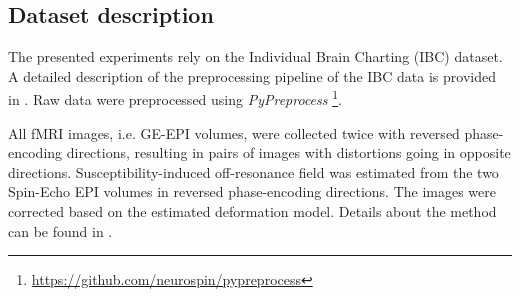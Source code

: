 

\subsection{Dataset description}
%
The presented experiments rely on the Individual Brain Charting (IBC) dataset.
%
A detailed description of the preprocessing pipeline of the IBC data is provided
in \citep{Pinho2021}.
%
Raw data were preprocessed using \emph{PyPreprocess}
\footnote{\url{https://github.com/neurospin/pypreprocess}}.

All fMRI images, i.e. GE-EPI volumes, were collected twice with reversed
phase-encoding directions, resulting in pairs of images with distortions going
in opposite directions.
%
Susceptibility-induced off-resonance field was estimated from the two Spin-Echo
EPI volumes in reversed phase-encoding directions.
%
The images were corrected based on the estimated deformation model.
%
Details about the method can be found in \citep{Andersson2003}.

